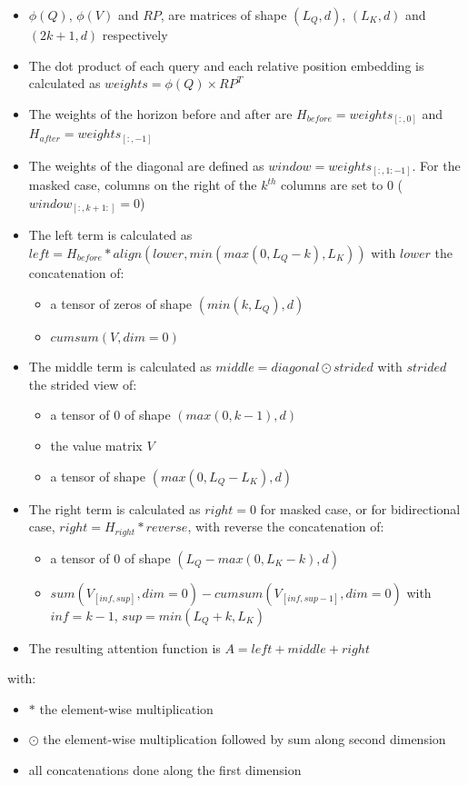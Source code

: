 \begin{itemize}
	\item
	\(\phi(Q)\), \(\phi(V)\) and \(RP\), are matrices of shape
	\((L_Q, d)\), \((L_K, d)\) and \((2k+1, d)\) respectively
	\item
	The dot product of each query and each relative position embedding is
	calculated as \(weights = \phi(Q) \times RP^T\)
	\item
	The weights of the horizon before and after are
	\(H_{before} = weights_{[:, 0]}\) and
	\(H_{after} = weights_{[:, -1]}\)
	\item
	The weights of the diagonal are defined as
	\(window = weights_{[:,1:-1]}\). For the masked case, columns on the
	right of the \(k^{th}\) columns are set to 0
	(\(window_{[:, k+1:]} = 0\))
	\item
	The left term is calculated as
	\(left = H_{before} * align(lower, min(max(0, L_Q-k), L_K))\) with
	\(lower\) the concatenation of:
	
	\begin{itemize}
		\item
		a tensor of zeros of shape \(\left(min(k, L_Q), d\right)\)
		\item
		\(cumsum(V, dim=0)\)
	\end{itemize}
	\item
	The middle term is calculated as \(middle = diagonal \odot strided\)
	with \(strided\) the strided view of:
	
	\begin{itemize}
		\item
		a tensor of 0 of shape \((max(0, k-1), d)\)
		\item
		the value matrix \(V\)
		\item
		a tensor of shape \((max(0, L_Q-L_K), d)\)
	\end{itemize}
	\item
	The right term is calculated as \(right = 0\) for masked case, or for
	bidirectional case, \(right = H_{right} * reverse\), with reverse the
	concatenation of:
	
	\begin{itemize}
		\item
		a tensor of 0 of shape \((L_Q-max(0, L_K-k), d)\)
		\item
		\(sum(V_{[inf, sup]}, dim=0) - cumsum(V_{[inf, sup-1]}, dim=0)\)
		with \(inf = k-1\), \(sup = min(L_Q+k, L_K)\)
	\end{itemize}
	\item
	The resulting attention function is \(A = left + middle + right\)
\end{itemize}

with:

\begin{itemize}
	\item
	\(*\) the element-wise multiplication
	\item
	\(\odot\) the element-wise multiplication followed by sum along second
	dimension
	\item
	all concatenations done along the first dimension
\end{itemize}

\endinput
